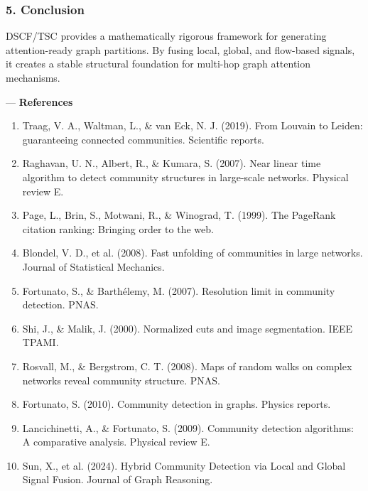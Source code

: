 \subsubsection{5. Conclusion}
DSCF/TSC provides a mathe\-matically rigorous framework for generating attention-ready graph partitions. By fusing local, global, and flow-based signals, it creates a stable structural foundation for multi-hop graph attention mechanisms.

---
\textbf{References}
\begin{enumerate}
\item Traag, V. A., Waltman, L., \& van Eck, N. J. (2019). From Louvain to Leiden: guara\-nteeing connected communities. Scientific reports.
\item Raghavan, U. N., Albert, R., \& Kumara, S. (2007). Near linear time algorithm to detect community structures in large-scale networks. Physical review E.
\item Page, L., Brin, S., Motwani, R., \& Winograd, T. (1999). The PageRank citation ranking: Bringing order to the web.
\item Blondel, V. D., et al. (2008). Fast unfolding of communities in large networks. Journal of Statistical Mechanics.
\item Fortunato, S., \& Barthélemy, M. (2007). Resolution limit in community detection. PNAS.
\item Shi, J., \& Malik, J. (2000). Normalized cuts and image segme\-ntation. IEEE TPAMI.
\item Rosvall, M., \& Bergstrom, C. T. (2008). Maps of random walks on complex networks reveal community structure. PNAS.
\item Fortunato, S. (2010). Community detection in graphs. Physics reports.
\item Lancic\-hinetti, A., \& Fortunato, S. (2009). Community detection algorithms: A comparative analysis. Physical review E.
\item Sun, X., et al. (2024). Hybrid Community Detection via Local and Global Signal Fusion. Journal of Graph Reasoning.

\end{enumerate}